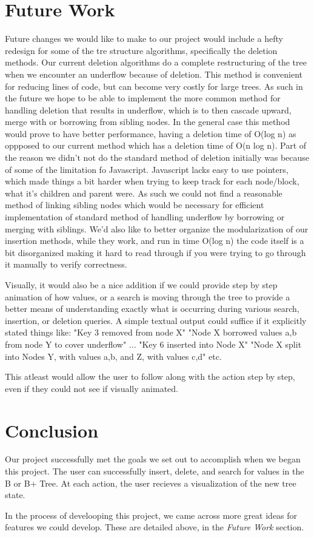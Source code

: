 \section{Future Work}

Future changes we would like to make to our project would include a
hefty redesign for some of the tre structure algorithms, specifically
the deletion methods.  Our current deletion algorithms do a complete
restructuring of the tree when we encounter an underflow because of
deletion.  This method is convenient for reducing lines of code, but
can become very costly for large trees.  As such in the future we hope
to be able to implement the more common method for handling deletion
that results in underflow, which is to then cascade upward, merge with
or borrowing from sibling nodes.  In the general case this method
would prove to have better performance, having a deletion time of
O(log n) as oppposed to our current method which has a deletion time
of O(n log n).  Part of the reason we didn't not do the standard
method of deletion initially was because of some of the limitation fo
Javascript.  Javascript lacks easy to use pointers, which made things
a bit harder when trying to keep track for each node/block, what it's
children and parent were.  As such we could not find a reasonable
method of linking sibling nodes which would be necessary for efficient
implementation of standard method of handling underflow by borrowing
or merging with siblings.  We'd also like to better organize the
modularization of our insertion methods, while they work, and run in
time O(log n) the code itself is a bit disorganized making it hard to
read through if you were trying to go through it manually to verify
correctness.

Visually, it would also be a nice addition if we could provide step by
step animation of how values, or a search is moving through the tree
to provide a better means of understanding exactly what is occurring
during various search, insertion, or deletion queries.  A simple
textual output could suffice if it explicitly stated things like:
"Key 3 removed from node X"
"Node X borrowed values a,b from node Y to cover underflow"
...
"Key 6 inserted into Node X"
"Node X split into Nodes Y, with values a,b, and Z, with values c,d"
etc.

This atleast would allow the user to follow along with the action step
by step, even if they could not see if visually animated.

\section{Conclusion}

Our project successfully met the goals we set out to accomplish when
we began this project. The user can successfully insert, delete, and
search for values in the B or B+ Tree. At each action, the user
recieves a visualization of the new tree state.

In the process of develooping this project, we came across more great
ideas for features we could develop. These are detailed above, in the
\textit{Future Work} section.
